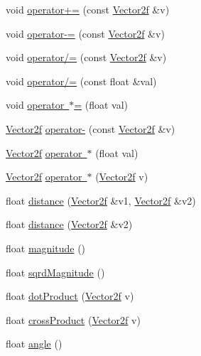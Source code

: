 \begin{DoxyCompactItemize}
void \mbox{\hyperlink{class_vector2f_a11ff6a64f8db4da7ae303cc9261e2386}{operator+=}} (const \mbox{\hyperlink{class_vector2f}{Vector2f}} \&v)
\item 
void \mbox{\hyperlink{class_vector2f_ad52243b72cb0524e4ac6d3cdfbc5e5fe}{operator-\/=}} (const \mbox{\hyperlink{class_vector2f}{Vector2f}} \&v)
\item 
void \mbox{\hyperlink{class_vector2f_af4696d8e4c4055162e3412efbe95b7e0}{operator/=}} (const \mbox{\hyperlink{class_vector2f}{Vector2f}} \&v)
\item 
void \mbox{\hyperlink{class_vector2f_a57392e8fe0d5d6d2d91b88926543eb6d}{operator/=}} (const float \&val)
\item 
void \mbox{\hyperlink{class_vector2f_a236a3df8c7038735777a6bb82d72d3e0}{operator $\ast$=}} (float val)
\item 
\mbox{\hyperlink{class_vector2f}{Vector2f}} \mbox{\hyperlink{class_vector2f_a86b9209af5401c4a10ab301522eb79c3}{operator-\/}} (const \mbox{\hyperlink{class_vector2f}{Vector2f}} \&v)
\item 
\mbox{\hyperlink{class_vector2f}{Vector2f}} \mbox{\hyperlink{class_vector2f_aa294c4f2927395f299c8c2edcd20e9fa}{operator $\ast$}} (float val)
\item 
\mbox{\hyperlink{class_vector2f}{Vector2f}} \mbox{\hyperlink{class_vector2f_a9d3e3d9000757cb55b2c079a1051e4ec}{operator $\ast$}} (\mbox{\hyperlink{class_vector2f}{Vector2f}} v)
\item 
float \mbox{\hyperlink{class_vector2f_a74913cfbfcd4e602b78cac43352d5e05}{distance}} (\mbox{\hyperlink{class_vector2f}{Vector2f}} \&v1, \mbox{\hyperlink{class_vector2f}{Vector2f}} \&v2)
\item 
float \mbox{\hyperlink{class_vector2f_a187880c306ea98069a7286a320435eb6}{distance}} (\mbox{\hyperlink{class_vector2f}{Vector2f}} \&v2)
\item 
float \mbox{\hyperlink{class_vector2f_a1e8682f591032c92c6f4c33100d36789}{magnitude}} ()
\item 
float \mbox{\hyperlink{class_vector2f_adda2d2ca67f30230a77fe1faf0256688}{sqrd\+Magnitude}} ()
\item 
float \mbox{\hyperlink{class_vector2f_a909b67d994afb50a2c77b9fa45681914}{dot\+Product}} (\mbox{\hyperlink{class_vector2f}{Vector2f}} v)
\item 
float \mbox{\hyperlink{class_vector2f_a388d18e14a48e7db6e62c7aef50548c5}{cross\+Product}} (\mbox{\hyperlink{class_vector2f}{Vector2f}} v)
\item 
float \mbox{\hyperlink{class_vector2f_a2d8be50dd28dc0ba8c1dcf1ecada2a23}{angle}} ()

\end{DoxyCompactItemize}
